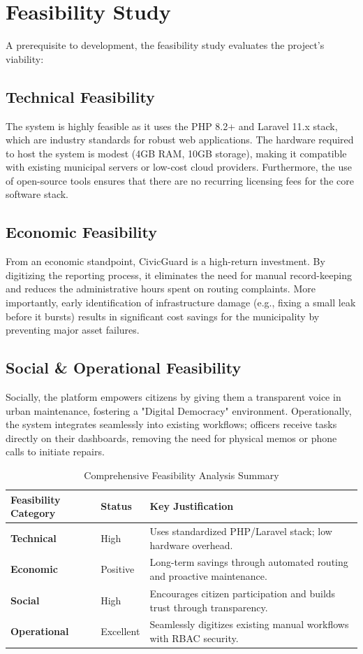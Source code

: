 \section{Feasibility Study}
A prerequisite to development, the feasibility study evaluates the project's viability:

\subsection{Technical Feasibility}
The system is highly feasible as it uses the PHP 8.2+ and Laravel 11.x stack, which are industry standards for robust web applications. The hardware required to host the system is modest (4GB RAM, 10GB storage), making it compatible with existing municipal servers or low-cost cloud providers. Furthermore, the use of open-source tools ensures that there are no recurring licensing fees for the core software stack.

\subsection{Economic Feasibility}
From an economic standpoint, CivicGuard is a high-return investment. By digitizing the reporting process, it eliminates the need for manual record-keeping and reduces the administrative hours spent on routing complaints. More importantly, early identification of infrastructure damage (e.g., fixing a small leak before it bursts) results in significant cost savings for the municipality by preventing major asset failures.

\subsection{Social \& Operational Feasibility}
Socially, the platform empowers citizens by giving them a transparent voice in urban maintenance, fostering a "Digital Democracy" environment. Operationally, the system integrates seamlessly into existing workflows; officers receive tasks directly on their dashboards, removing the need for physical memos or phone calls to initiate repairs.

\begin{table}[H]
\centering
\renewcommand{\arraystretch}{1.5}
\begin{tabular}{|p{4cm}|p{3cm}|p{7cm}|}
\hline
\textbf{Feasibility Category} & \textbf{Status} & \textbf{Key Justification} \\ \hline
\textbf{Technical} & High & Uses standardized PHP/Laravel stack; low hardware overhead. \\ \hline
\textbf{Economic} & Positive & Long-term savings through automated routing and proactive maintenance. \\ \hline
\textbf{Social} & High & Encourages citizen participation and builds trust through transparency. \\ \hline
\textbf{Operational} & Excellent & Seamlessly digitizes existing manual workflows with RBAC security. \\ \hline
\end{tabular}
\caption{Comprehensive Feasibility Analysis Summary}
\label{tab:feasibility_summary}
\end{table}

